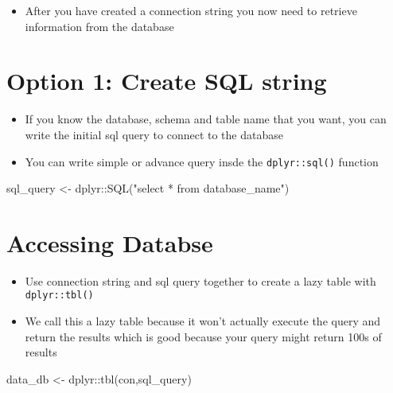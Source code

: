 \documentclass[
  letterpaper,
  DIV=11,
  numbers=noendperiod]{scrreprt}
\newenvironment{Shaded}{\begin{snugshade}}{\end{snugshade}}
\newcommand{\FunctionTok}[1]{\textcolor[rgb]{0.28,0.35,0.67}{#1}}
\newcommand{\NormalTok}[1]{\textcolor[rgb]{0.00,0.23,0.31}{#1}}
\newcommand{\OtherTok}[1]{\textcolor[rgb]{0.00,0.23,0.31}{#1}}
\newcommand{\SpecialCharTok}[1]{\textcolor[rgb]{0.37,0.37,0.37}{#1}}
\newcommand{\StringTok}[1]{\textcolor[rgb]{0.13,0.47,0.30}{#1}}
\providecommand{\tightlist}{%
  \setlength{\itemsep}{0pt}\setlength{\parskip}{0pt}}\usepackage{longtable,booktabs,array}
\begin{document}
\begin{itemize}
\tightlist
\item
  After you have created a connection string you now need to retrieve
  information from the database
\end{itemize}

\section{Option 1: Create SQL string}\label{option-1-create-sql-string}

\begin{itemize}
\item
  If you know the database, schema and table name that you want, you can
  write the initial sql query to connect to the database
\item
  You can write simple or advance query insde the \texttt{dplyr::sql()}
  function
\end{itemize}

\begin{Shaded}
\begin{Highlighting}[]
\NormalTok{sql\_query }\OtherTok{\textless{}{-}}\NormalTok{ dplyr}\SpecialCharTok{::}\FunctionTok{SQL}\NormalTok{(}\StringTok{"select *  from database\_name"}\NormalTok{)}
\end{Highlighting}
\end{Shaded}

\section{Accessing Databse}\label{accessing-databse}

\begin{itemize}
\tightlist
\item
  Use connection string and sql query together to create a lazy table
  with \texttt{dplyr::tbl()}
\item
  We call this a lazy table because it won't actually execute the query
  and return the results which is good because your query might return
  100s of results
\end{itemize}

\begin{Shaded}
\begin{Highlighting}[]
\NormalTok{data\_db }\OtherTok{\textless{}{-}}\NormalTok{ dplyr}\SpecialCharTok{::}\FunctionTok{tbl}\NormalTok{(con,sql\_query)}
\end{Highlighting}
\end{Shaded}
\end{document}
